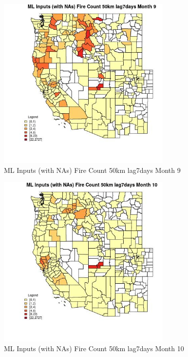 \begin{figure} 
\centering  
\includegraphics[width=0.77\textwidth]{Code_Outputs/Report_ML_input_PM25_Step4_part_f_de_duplicated_aves_prioritize_24hr_obswNAs_CountyFire_Count_50km_lag7daysmedianMonth9.jpg} 
\caption{\label{fig:Report_ML_input_PM25_Step4_part_f_de_duplicated_aves_prioritize_24hr_obswNAsCountyFire_Count_50km_lag7daysmedianMonth9}ML Inputs (with NAs) Fire Count 50km lag7days Month 9} 
\end{figure} 
 

\begin{figure} 
\centering  
\includegraphics[width=0.77\textwidth]{Code_Outputs/Report_ML_input_PM25_Step4_part_f_de_duplicated_aves_prioritize_24hr_obswNAs_CountyFire_Count_50km_lag7daysmedianMonth10.jpg} 
\caption{\label{fig:Report_ML_input_PM25_Step4_part_f_de_duplicated_aves_prioritize_24hr_obswNAsCountyFire_Count_50km_lag7daysmedianMonth10}ML Inputs (with NAs) Fire Count 50km lag7days Month 10} 
\end{figure} 
 

